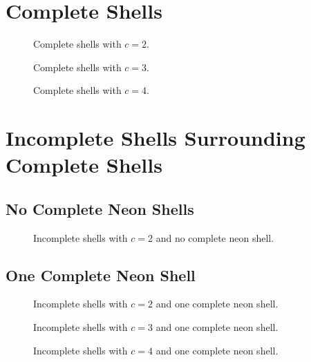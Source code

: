 \section{Complete Shells}
\begin{figure}[!h]
    \centering
    
    \caption{Complete shells with $c=2$.}
    \label{compl02}
\end{figure}

\begin{figure}
    \centering
    
    \caption{Complete shells with $c=3$.}
    \label{compl03}
\end{figure}

\begin{figure}[!h]
    \centering
    
    \caption{Complete shells with $c=4$.}
    \label{compl04}
\end{figure}



\section{Incomplete Shells Surrounding Complete Shells}
\subsection{No Complete Neon Shells}
\begin{figure}[h]
    \centering
    
    \caption{Incomplete shells with $c=2$ and no complete neon shell.}
    \label{incompl00-core02}
\end{figure}


\subsection{One Complete Neon Shell}
\begin{figure}[h]
    \centering
    
    \caption{Incomplete shells with $c=2$ and one complete neon shell.}
    \label{incompl01-core02}
\end{figure}

\begin{figure}
    \centering
    
    \caption{Incomplete shells with $c=3$ and one complete neon shell.}
    \label{incompl01-core03}
\end{figure}

\begin{figure}[h]
    \centering
    
    \caption{Incomplete shells with $c=4$ and one complete neon shell.}
    \label{incompl00-core01}
\end{figure}

